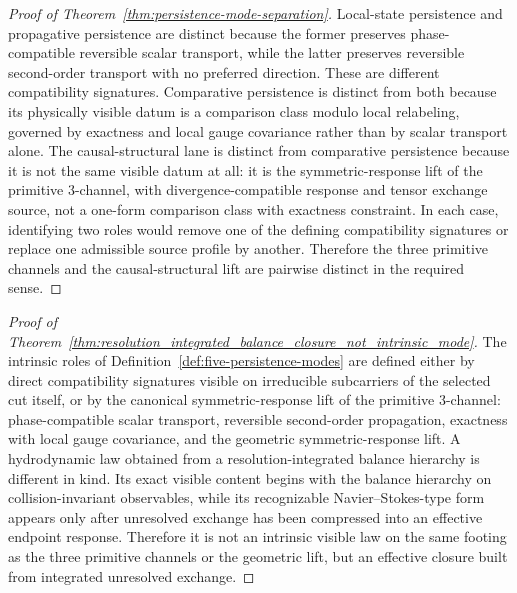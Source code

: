 \label{sec:appendix-carrier}


\begin{proof}[Proof of Theorem~\ref{thm:persistence-mode-separation}]
\label{proof:thm:persistence-mode-separation}
Local-state persistence and propagative persistence are distinct because the
former preserves phase-compatible reversible scalar transport, while the latter
preserves reversible second-order transport with no preferred direction. These
are different compatibility signatures. Comparative persistence is distinct
from both because its physically visible datum is a comparison class modulo
local relabeling, governed by exactness and local gauge covariance rather than
by scalar transport alone. The causal-structural lane is distinct from
comparative persistence because it is not the same visible datum at all: it is
the symmetric-response lift of the primitive \(3\)-channel, with
divergence-compatible response and tensor exchange source, not a one-form
comparison class with exactness constraint. In each case, identifying two
roles would remove one of the defining compatibility signatures or replace one
admissible source profile by another. Therefore the three primitive channels
and the causal-structural lift are pairwise distinct in the required sense.
\end{proof}

\begin{proof}[Proof of Theorem~\ref{thm:resolution_integrated_balance_closure_not_intrinsic_mode}]
\label{proof:thm:resolution_integrated_balance_closure_not_intrinsic_mode}
The intrinsic roles of Definition~\ref{def:five-persistence-modes} are defined
either by direct compatibility signatures visible on irreducible subcarriers of
the selected cut itself, or by the canonical symmetric-response lift of the
primitive \(3\)-channel: phase-compatible scalar transport, reversible
second-order propagation, exactness with local gauge covariance, and the
geometric symmetric-response lift. A hydrodynamic law obtained from a
resolution-integrated balance hierarchy is different in kind. Its exact visible
content begins with the balance hierarchy on collision-invariant observables,
while its recognizable Navier--Stokes-type form appears only after unresolved
exchange has been compressed into an effective endpoint response. Therefore it
is not an intrinsic visible law on the same footing as the three primitive
channels or the geometric lift, but an effective closure built from integrated
unresolved exchange.
\end{proof}

